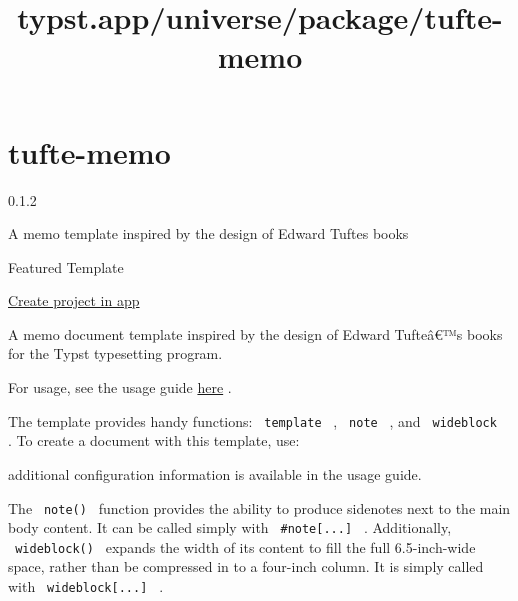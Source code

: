 \title{typst.app/universe/package/tufte-memo}

\label{banner}
\label{template-thumbnail}

\section{tufte-memo}\label{tufte-memo}

{ 0.1.2 }

A memo template inspired by the design of Edward Tufte\textquotesingle s
books

{ } Featured Template

\href{/app?template=tufte-memo&version=0.1.2}{Create project in app}

\label{readme}
A memo document template inspired by the design of Edward Tufteâ€™s
books for the Typst typesetting program.

For usage, see the usage guide
\href{https://github.com/nogula/tufte-memo/blob/main/template/main.pdf}{here}
.

The template provides handy functions: \texttt{\ template\ } ,
\texttt{\ note\ } , and \texttt{\ wideblock\ } . To create a document
with this template, use:

\begin{Shaded}
\begin{Highlighting}[]

\NormalTok{        (}
\NormalTok{        ),}
\NormalTok{    )}
\NormalTok{)}
\end{Highlighting}
\end{Shaded}

additional configuration information is available in the usage guide.

The \texttt{\ note()\ } function provides the ability to produce
sidenotes next to the main body content. It can be called simply with
\texttt{\ \#note{[}...{]}\ } . Additionally, \texttt{\ wideblock()\ }
expands the width of its content to fill the full 6.5-inch-wide space,
rather than be compressed in to a four-inch column. It is simply called
with \texttt{\ wideblock{[}...{]}\ } .

